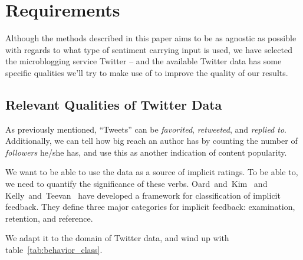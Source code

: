 
\chapter{Requirements} %

\label{Chapter3} %


% 
% 

Although the methods described in this paper aims to be as agnostic as possible with regards to what type of sentiment carrying input is used, we have selected the microblogging service Twitter -- and the available Twitter data has some specific qualities we'll try to make use of to improve the quality of our results.

\section{Relevant Qualities of Twitter Data} %
\label{sec:relevant_qualities_of_twitter_data}

As previously mentioned, ``Tweets'' can be \emph{favorited}, \emph{retweeted}, and \emph{replied to}.
Additionally, we can tell how big reach an author has by counting the number of \emph{followers} he/she has, and use this as another indication of content popularity.

We want to be able to use the data as a source of implicit ratings. To be able to, we need to quantify the significance of these verbs.
Oard~and~Kim~\cite{Oard98implicitfeedback,Oard01modelinginformation} and Kelly~and~Teevan~\cite{Kelly03implicitfeedback} have developed a framework for classification of implicit feedback.
They define three major categories for implicit feedback: examination, retention, and reference.

We adapt it to the domain of Twitter data, and wind up with table~\ref{tab:behavior_class}.

